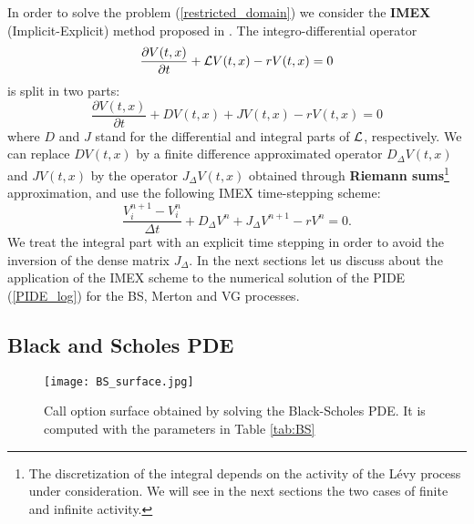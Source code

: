 In order to solve the problem (\ref{restricted_domain}) we consider the \textbf{IMEX} (Implicit-Explicit) method proposed in \cite{CoVo05b}.
The integro-differential operator 
$$ \frac{\partial V(t,x)}{\partial t} + \mathcal{L} V(t,x) -r V(t,x) = 0 $$
is split in two parts:
$$ \frac{\partial V(t,x)}{\partial t} + D V(t,x) + J V(t,x) -r V(t,x) = 0 $$
where $D$ and $J$ stand for the differential and integral parts of $\mathcal{L}$, respectively. We can replace $D V(t,x)$ by a finite difference approximated operator $D_{\Delta} V(t,x)$ 
and $J V(t,x)$
by the operator $J_{\Delta} V(t,x)$ obtained through \textbf{Riemann sums}\footnote{The discretization of the integral depends on the activity of the Lévy process under consideration.
We will see in the next sections the two cases of finite and infinite activity.} approximation, and use the following IMEX time-stepping scheme:
\begin{equation}
 \frac{V^{n+1}_{i} -V^{n}_{i}}{\Delta t} + D_{\Delta} V^{n} + J_{\Delta} V^{n+1} - r V^{n} = 0. 
\end{equation}
We treat the integral part with an explicit time stepping in order to avoid the inversion of the dense matrix $J_{\Delta}$. 
In the next sections let us discuss about the application of the IMEX scheme to the numerical solution of the PIDE (\ref{PIDE_log}) for the BS, Merton and VG processes. 


\subsection{Black and Scholes PDE}

\begin{figure}[t]
   \centering
   \texttt{[image: BS\_surface.jpg]}
   \caption{Call option surface obtained by solving the Black-Scholes PDE. It is computed with the parameters in Table \ref{tab:BS}}
   \label{BS_surface} 
\end{figure}

